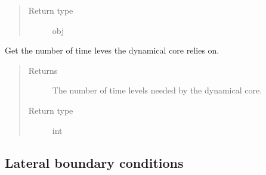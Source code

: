 \documentclass[letterpaper,10pt,english]{sphinxmanual}
\begin{document}
\begin{fulllineitems}
\begin{fulllineitems}
\begin{quote}
\begin{description}
\item[{Return type}] \leavevmode
obj

\end{description}\end{quote}

\end{fulllineitems}


\begin{fulllineitems}
\label{\detokenize{api:dycore.dycore_isentropic.DynamicalCoreIsentropic.time_levels}}
Get the number of time leves the dynamical core relies on.
\begin{quote}\begin{description}
\item[{Returns}] \leavevmode
The number of time levels needed by the dynamical core.

\item[{Return type}] \leavevmode
int

\end{description}\end{quote}

\end{fulllineitems}


\end{fulllineitems}



\subsection{Lateral boundary conditions}
\label{\detokenize{api:lateral-boundary-conditions}}
\end{document}
